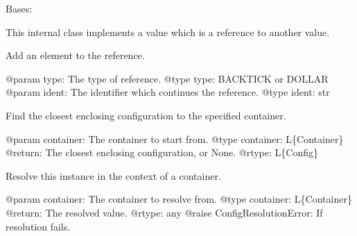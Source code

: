 \documentclass[a4paper,10pt,english]{sphinxmanual}
\begin{document}
\begin{fulllineitems}
\label{commands/apidoc/src:src.pyconf.Reference}
Bases: 

This internal class implements a value which is a reference to another value.

\begin{fulllineitems}
\label{commands/apidoc/src:src.pyconf.Reference.addElement}
Add an element to the reference.

@param type: The type of reference.
@type type: BACKTICK or DOLLAR
@param ident: The identifier which continues the reference.
@type ident: str

\end{fulllineitems}


\begin{fulllineitems}
\label{commands/apidoc/src:src.pyconf.Reference.findConfig}
Find the closest enclosing configuration to the specified container.

@param container: The container to start from.
@type container: L\{Container\}
@return: The closest enclosing configuration, or None.
@rtype: L\{Config\}

\end{fulllineitems}


\begin{fulllineitems}
\label{commands/apidoc/src:src.pyconf.Reference.resolve}
Resolve this instance in the context of a container.

@param container: The container to resolve from.
@type container: L\{Container\}
@return: The resolved value.
@rtype: any
@raise ConfigResolutionError: If resolution fails.

\end{fulllineitems}


\end{fulllineitems}

\end{document}
